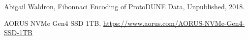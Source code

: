 \documentclass{article}
\begin{document}
\begin{thebibliography}{999}

  Abigail Waldron,
  Fibonnaci Encoding of ProtoDUNE Data, Unpublished,
  2018.
  
  AORUS NVMe Gen4 SSD 1TB,
  \url{https://www.aorus.com/AORUS-NVMe-Gen4-SSD-1TB}
  
  

\end{thebibliography}

\newpage
\printglossary
\end{document}
